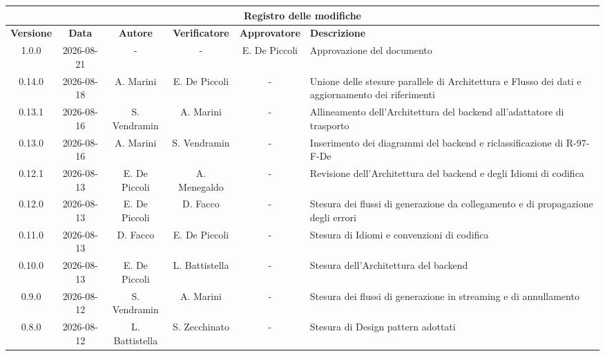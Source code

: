 \documentclass[a4paper, 10pt]{article}
\begin{document}
\begingroup
\small
\renewcommand{\theHtable}{registro-modifiche}
\begin{longtable}{|c|c|c|c|c|p{3cm}|}
    \hline
    \multicolumn{6}{|c|}{\textbf{Registro delle modifiche}} \\
    \hline
    \textbf{Versione} & \textbf{Data} & \textbf{Autore} & \textbf{Verificatore} & \textbf{Approvatore} & \textbf{Descrizione} \\
    \hline
    \endhead
    1.0.0 & 2026-08-21 & - & - & E. De Piccoli & Approvazione del documento \\ \hline

    0.14.0 & 2026-08-18 & A. Marini & E. De Piccoli & - & Unione delle stesure parallele di Architettura e Flusso dei dati e aggiornamento dei riferimenti \\ \hline

    0.13.1 & 2026-08-16 & S. Vendramin & A. Marini & - & Allineamento dell'Architettura del backend all'adattatore di trasporto \\ \hline

    0.13.0 & 2026-08-16 & A. Marini & S. Vendramin & - & Inserimento dei diagrammi del backend e riclassificazione di R-97-F-De \\ \hline

    0.12.1 & 2026-08-13 & E. De Piccoli & A. Menegaldo & - & Revisione dell'Architettura del backend e degli Idiomi di codifica \\ \hline

    0.12.0 & 2026-08-13 & E. De Piccoli & D. Facco & - & Stesura dei flussi di generazione da collegamento e di propagazione degli errori \\ \hline

    0.11.0 & 2026-08-13 & D. Facco & E. De Piccoli & - & Stesura di Idiomi e convenzioni di codifica \\ \hline

    0.10.0 & 2026-08-13 & E. De Piccoli & L. Battistella & - & Stesura dell'Architettura del backend \\ \hline

    0.9.0 & 2026-08-12 & S. Vendramin & A. Marini & - & Stesura dei flussi di generazione in streaming e di annullamento \\ \hline

    0.8.0 & 2026-08-12 & L. Battistella & S. Zecchinato & - & Stesura di Design pattern adottati \\ \hline


\end{longtable}
\end{document}
